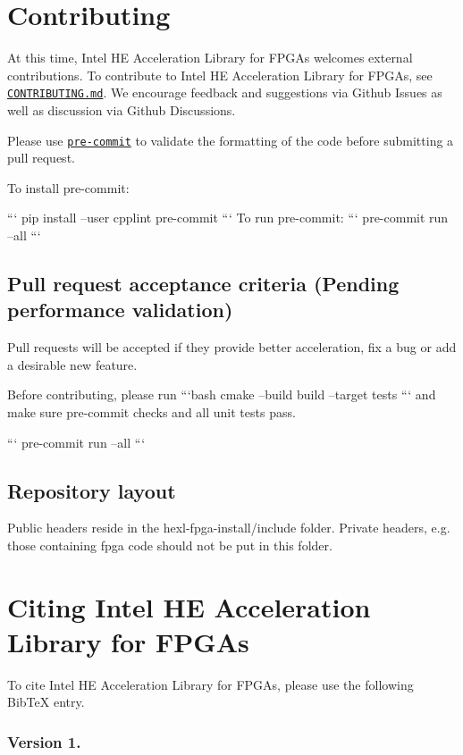 \section*{Contributing}

At this time, Intel H\-E Acceleration Library for F\-P\-G\-As welcomes external contributions. To contribute to Intel H\-E Acceleration Library for F\-P\-G\-As, see \href{CONTRIBUTING.md}{\tt C\-O\-N\-T\-R\-I\-B\-U\-T\-I\-N\-G.\-md}. We encourage feedback and suggestions via Github Issues as well as discussion via Github Discussions.

Please use \href{https://pre-commit.com/}{\tt pre-\/commit} to validate the formatting of the code before submitting a pull request. \par
 To install pre-\/commit\-: \par
 ``` pip install --user cpplint pre-\/commit ``` To run pre-\/commit\-: ``` pre-\/commit run --all ```

\subsection*{Pull request acceptance criteria (Pending performance validation)}

Pull requests will be accepted if they provide better acceleration, fix a bug or add a desirable new feature.

Before contributing, please run ```bash cmake --build build --target tests ``` and make sure pre-\/commit checks and all unit tests pass. \par


``` pre-\/commit run --all ```

\subsection*{Repository layout}

Public headers reside in the {\ttfamily hexl-\/fpga-\/install/include} folder. Private headers, e.\-g. those containing fpga code should not be put in this folder.

\section*{Citing Intel H\-E Acceleration Library for F\-P\-G\-As}

To cite Intel H\-E Acceleration Library for F\-P\-G\-As, please use the following Bib\-Te\-X entry.

\subsubsection*{Version 1.}

